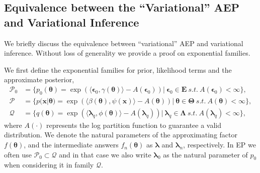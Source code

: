 \documentclass{article} %
\begin{document}
\subsection{Equivalence between the ``Variational'' AEP and Variational Inference}
We briefly discuss the equivalence between ``variational'' AEP and variational inference.  
%
Without loss of generality we provide a proof on exponential families. 

We first define the exponential families for prior, likelihood terms and the approximate posterior,
\begin{align}
\mathcal{P}_0 &= \{p_0(\bm{\theta}) = \exp \left( \langle \bm{\epsilon}_0, \gamma(\bm{\theta}) \rangle - A(\bm{\epsilon}_0) \right) |\ \bm{\epsilon}_0 \in \bm{E} \ s.t.~ A(\bm{\epsilon}_0) < \infty \}, \\
\mathcal{P} &= \{p(\bm{x} | \bm{\theta}) = \exp \left( \langle \beta(\bm{\theta}), \psi(\bm{x}) \rangle - A(\bm{\theta}) \right) |\ \bm{\theta} \in \bm{\Theta} \ s.t.~ A(\bm{\theta}) < \infty \}, \\
\mathcal{Q} &= \{q(\bm{\theta}) = \exp \left( \langle \bm{\lambda}_q, \phi(\bm{\theta}) \rangle - A(\bm{\lambda}_q) \right) |\ \bm{\lambda}_q \in \bm{\Lambda} \ s.t.~ A(\bm{\lambda}_q) < \infty \},
\end{align}
where $A(\cdot)$ represents the log partition function to guarantee a valid distribution. We denote the natural parameters of the approximating factor $f(\bm{\theta})$, and the intermediate answers $f_n(\bm{\theta})$ as $\bm{\lambda}$ and $\bm{\lambda}_n$, respectively. In EP we often use $\mathcal{P}_0 \subset \mathcal{Q}$ and in that case we also write $\bm{\lambda}_0$ as the natural parameter of $p_0$ when considering it in family $\mathcal{Q}$.
\end{document}
